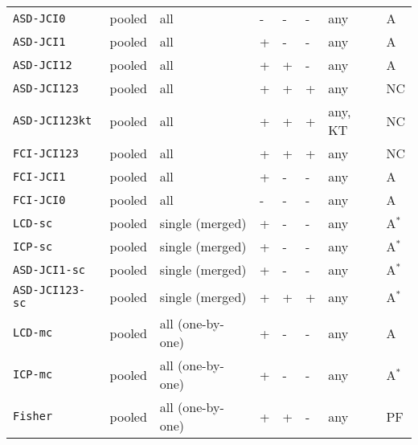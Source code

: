 \documentclass[twoside,11pt]{article}
\newcommand{\alg}[1]{\texttt{#1}}
\begin{document}
\begin{table}
{\begin{tabular}{llllllll}
  \hline
  \alg{ASD-JCI0}      & pooled        & all                 & - & - & - & any         & A  \\
  \alg{ASD-JCI1}      & pooled        & all                 & + & - & - & any         & A  \\
  \alg{ASD-JCI12}     & pooled        & all                 & + & + & - & any         & A  \\
  \alg{ASD-JCI123}    & pooled        & all                 & + & + & + & any         & NC \\
  \alg{ASD-JCI123kt}  & pooled        & all                 & + & + & + & any, KT     & NC \\
  \hline
  \alg{FCI-JCI123}    & pooled        & all                 & + & + & + & any         & NC \\
  \alg{FCI-JCI1}      & pooled        & all                 & + & - & - & any         & A  \\
  \alg{FCI-JCI0}      & pooled        & all                 & - & - & - & any         & A  \\
  \hline
  \alg{LCD-sc}        & pooled        & single (merged)     & + & - & - & any         & A$^*$  \\
  \alg{ICP-sc}        & pooled        & single (merged)     & + & - & - & any         & A$^*$  \\
  \alg{ASD-JCI1-sc}   & pooled        & single (merged)     & + & - & - & any         & A$^*$  \\
  \alg{ASD-JCI123-sc} & pooled        & single (merged)     & + & + & + & any         & A$^*$  \\
  \hline
  \alg{LCD-mc}        & pooled        & all (one-by-one)    & + & - & - & any         & A  \\
  \alg{ICP-mc}        & pooled        & all (one-by-one)    & + & - & - & any         & A$^*$  \\
  \hline
  \alg{Fisher}        & pooled        & all (one-by-one)    & + & + & - & any         & PF \\
  \hline
  \end{tabular}}
\end{table}
\end{document}
